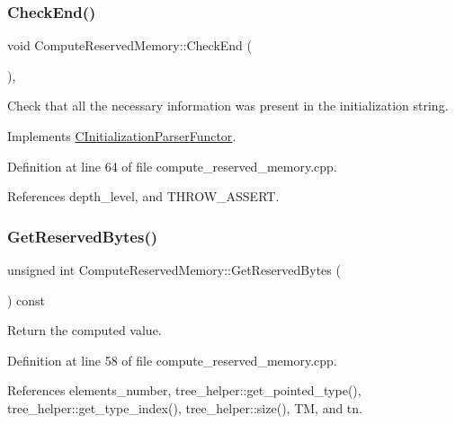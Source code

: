 \subsubsection{\texorpdfstring{Check\+End()}{CheckEnd()}}
{\footnotesize\ttfamily void Compute\+Reserved\+Memory\+::\+Check\+End (\begin{DoxyParamCaption}{ }\end{DoxyParamCaption})\hspace{0.3cm}{\ttfamily [override]}, {\ttfamily [virtual]}}



Check that all the necessary information was present in the initialization string. 



Implements \hyperlink{classCInitializationParserFunctor_aa639277133d141fd3aeed2add158c920}{C\+Initialization\+Parser\+Functor}.



Definition at line 64 of file compute\+\_\+reserved\+\_\+memory.\+cpp.



References depth\+\_\+level, and T\+H\+R\+O\+W\+\_\+\+A\+S\+S\+E\+RT.

\mbox{\label{classComputeReservedMemory_a2563b08ab753dea5d8c55708d63e3318}} 
\subsubsection{\texorpdfstring{Get\+Reserved\+Bytes()}{GetReservedBytes()}}
{\footnotesize\ttfamily unsigned int Compute\+Reserved\+Memory\+::\+Get\+Reserved\+Bytes (\begin{DoxyParamCaption}{ }\end{DoxyParamCaption}) const}



Return the computed value. 



Definition at line 58 of file compute\+\_\+reserved\+\_\+memory.\+cpp.



References elements\+\_\+number, tree\+\_\+helper\+::get\+\_\+pointed\+\_\+type(), tree\+\_\+helper\+::get\+\_\+type\+\_\+index(), tree\+\_\+helper\+::size(), TM, and tn.

